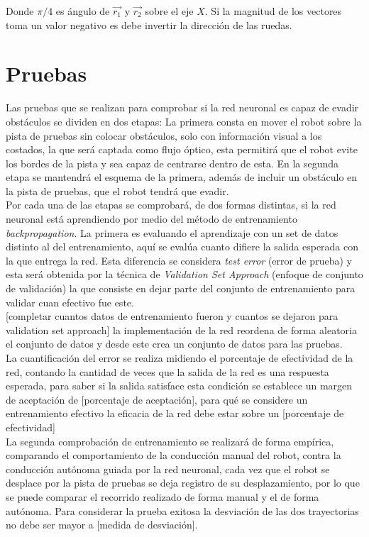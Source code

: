 \documentclass{iccmemoria}
\begin{document}
Donde $\pi/4$ es ángulo de $\vec{r_{1}}$ y $\vec{r_{2}}$ sobre el eje $X$. Si la magnitud de los vectores toma un valor negativo es debe invertir la dirección de las ruedas.\\

\chapter{Pruebas}

Las pruebas que se realizan para comprobar si la red neuronal es capaz de evadir obstáculos se dividen en dos etapas: La primera consta en mover el robot sobre la pista de pruebas sin colocar obstáculos, solo con información visual a los costados, la que será captada como flujo óptico, esta permitirá que el robot evite los bordes de la pista y sea capaz de centrarse dentro de esta. En la segunda etapa se mantendrá el esquema de la primera, además de incluir un obstáculo en la pista de pruebas, que el robot tendrá que evadir.\\

Por cada una de las etapas se comprobará, de dos formas distintas, si la red neuronal está aprendiendo por medio del método de entrenamiento \emph{backpropagation}. La primera es evaluando el aprendizaje con un set de datos distinto al del entrenamiento, aquí se evalúa cuanto difiere la salida esperada con la que entrega la red. Esta diferencia se considera \emph{test error} (error de prueba) y esta será obtenida por la técnica de \emph{Validation Set Approach} (enfoque de conjunto de validación) la que consiste en dejar parte del conjunto de entrenamiento para validar cuan efectivo fue este.\\

[completar cuantos datos de entrenamiento fueron y cuantos se dejaron para validation set approach]
la implementación de la red reordena de forma aleatoria el conjunto de datos y desde este crea un conjunto de datos para las pruebas.\\

La cuantificación del error se realiza midiendo el porcentaje de efectividad de la red, contando la cantidad de veces que la salida de la red es una respuesta esperada, para saber si la salida satisface esta condición se establece un margen de aceptación de [porcentaje de aceptación], para qué se considere un entrenamiento efectivo la eficacia de la red debe estar sobre un [porcentaje de efectividad]\\ 

La segunda comprobación de entrenamiento se realizará de forma empírica, comparando el comportamiento de la conducción manual del robot, contra la conducción autónoma guiada por la red neuronal, cada vez que el robot se desplace por la pista de pruebas se deja registro de su desplazamiento, por lo que se puede comparar el recorrido realizado de forma manual y el de forma autónoma. Para considerar la prueba exitosa la desviación de las dos trayectorias no debe ser mayor a [medida de desviación].\\
\end{document}
